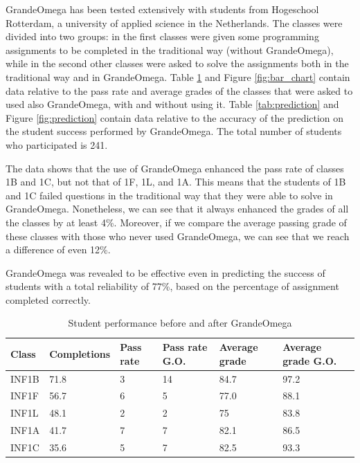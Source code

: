 GrandeOmega has been tested extensively with students from Hogeschool Rotterdam, a university of applied science in the Netherlands. The classes were divided into two groups: in the first classes were given some programming assignments to be completed in the traditional way (without GrandeOmega), while in the second other classes were asked to solve the assignments both in the traditional way and in GrandeOmega. Table \ref{tab:performance_go} and Figure \ref{fig:bar_chart} contain data relative to the pass rate and average grades of the classes that were asked to used also GrandeOmega, with and without using it. Table \ref{tab:prediction} and Figure \ref{fig:prediction} contain data relative to the accuracy of the prediction on the student success performed by GrandeOmega. The total number of students who participated is 241.

The data shows that the use of GrandeOmega enhanced the pass rate of classes 1B and 1C, but not that of 1F, 1L, and 1A. This means that the students of 1B and 1C failed questions in the traditional way that they were able to solve in GrandeOmega. Nonetheless, we can see that it always enhanced the grades of all the classes by at least 4\%. Moreover, if we compare the average passing grade of these classes with those who never used GrandeOmega, we can see that we reach a difference of even 12\%.

GrandeOmega was revealed to be effective even in predicting the success of students with a total reliability of 77\%, based on the percentage of assignment completed correctly.

\begin{table}
	\begin{tabular}{|p{}|p{}|p{}|p{}|p{}|p{}|}
		\hline
		\textbf{Class} & Completions & Pass rate & Pass rate G.O. & Average grade & Average grade G.O. \\
		\hline
		INF1B & 71.8 & 3 & 14 & 84.7 & 97.2 \\
		\hline
		INF1F & 56.7 & 6 & 5 & 77.0 & 88.1 \\
		\hline
		INF1L & 48.1 & 2 & 2 & 75 & 83.8 \\
		\hline
		INF1A & 41.7 & 7 & 7 & 82.1 & 86.5 \\
		\hline
		INF1C & 35.6 & 5 & 7 & 82.5 & 93.3 \\
		\hline
	\end{tabular}
	\caption{Student performance before and after GrandeOmega}
	\label{tab:performance_go}
\end{table}

